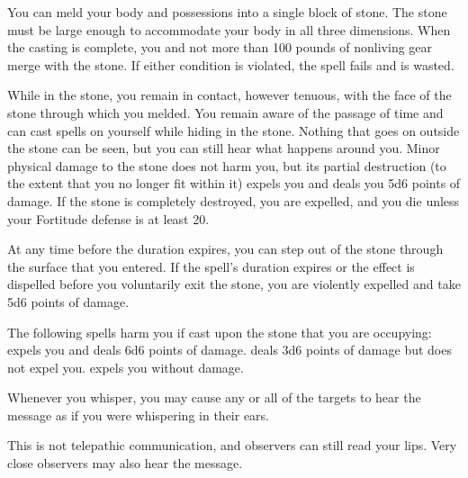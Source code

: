 \begin{spellheader}
    \spelldur{\durlong}
\end{spellheader}
\begin{spelleffects}
    \spelleffect You can meld your body and possessions into a single block of stone. The stone must be large enough to accommodate your body in all three dimensions. When the casting is complete, you and not more than 100 pounds of nonliving gear merge with the stone. If either condition is violated, the spell fails and is wasted.
    \par While in the stone, you remain in contact, however tenuous, with the face of the stone through which you melded. You remain aware of the passage of time and can cast spells on yourself while hiding in the stone. Nothing that goes on outside the stone can be seen, but you can still hear what happens around you. Minor physical damage to the stone does not harm you, but its partial destruction (to the extent that you no longer fit within it) expels you and deals you 5d6 points of damage. If the stone is completely destroyed, you are expelled, and you die unless your Fortitude defense is at least 20.
    \par At any time before the duration expires, you can step out of the stone through the surface that you entered. If the spell's duration expires or the effect is dispelled before you voluntarily exit the stone, you are violently expelled and take 5d6 points of damage.
\end{spelleffects}
\begin{spellfooter}
    \spellnotes The following spells harm you if cast upon the stone that you are occupying:  expels you and deals 6d6 points of damage.  deals 3d6 points of damage but does not expel you.  expels you without damage.
\end{spellfooter}

\begin{spellheader}
    \spellrng{\rngmed}
    \spelldur{\durlong}
\end{spellheader}
\begin{spelleffects}
    \spelleffect Whenever you whisper, you may cause any or all of the targets to hear the message as if you were whispering in their ears.
\end{spelleffects}
\begin{spellfooter}
    \spellnotes This is not telepathic communication, and observers can still read your lips. Very close observers may also hear the message.
\end{spellfooter}

